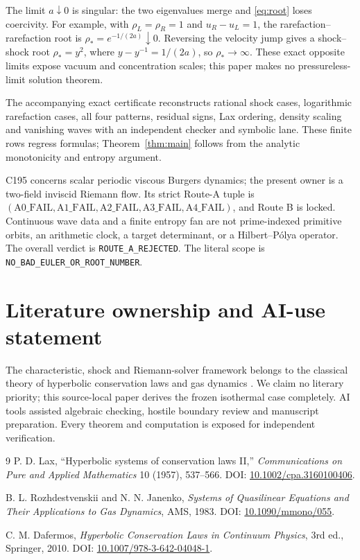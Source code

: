 \documentclass[10pt]{article}
\begin{document}
The limit $a\downarrow0$ is singular: the two eigenvalues merge and
\eqref{eq:root} loses coercivity.  For example, with
$\rho_L=\rho_R=1$ and $u_R-u_L=1$, the rarefaction--rarefaction root is
$\rho_*=e^{-1/(2a)}\downarrow0$.  Reversing the velocity jump gives a
shock--shock root $\rho_*=y^2$, where $y-y^{-1}=1/(2a)$, so
$\rho_*\to\infty$.  These exact opposite limits expose vacuum and
concentration scales; this paper makes no pressureless-limit solution
theorem.

The accompanying exact certificate reconstructs rational shock cases,
logarithmic rarefaction cases, all four patterns, residual signs, Lax ordering,
density scaling and vanishing waves with an independent checker and symbolic
lane.  These finite rows regress formulas; Theorem~\ref{thm:main} follows from
the analytic monotonicity and entropy argument.

C195 concerns scalar periodic viscous Burgers dynamics; the present owner is
a two-field inviscid Riemann flow.  Its strict Route-A tuple is
$(\mathrm{A0\_FAIL},\mathrm{A1\_FAIL},\mathrm{A2\_FAIL},
\mathrm{A3\_FAIL},\mathrm{A4\_FAIL})$, and Route B is locked.  Continuous
wave data and a finite entropy fan are not prime-indexed primitive orbits, an
arithmetic clock, a target determinant, or a Hilbert--P\'olya operator.
The overall verdict is \texttt{ROUTE\_A\_REJECTED}.
The literal scope is \texttt{NO\_BAD\_EULER\_OR\_ROOT\_NUMBER}.
\fi

\section*{Literature ownership and AI-use statement}
The characteristic, shock and Riemann-solver framework belongs to the
classical theory of hyperbolic conservation laws and gas dynamics
\cite{Lax1957,RozhdestvenskiiJanenko1983,Dafermos2010}.  We claim no literary
priority; this source-local paper derives the frozen isothermal case
completely.  AI tools assisted algebraic checking, hostile boundary review
and manuscript preparation.  Every theorem and computation is exposed for
independent verification.

\begin{thebibliography}{9}
P. D. Lax, ``Hyperbolic systems of conservation laws II,''
\emph{Communications on Pure and Applied Mathematics} 10 (1957), 537--566.
DOI: \href{https://doi.org/10.1002/cpa.3160100406}{10.1002/cpa.3160100406}.

B. L. Rozhdestvenskii and N. N. Janenko,
\emph{Systems of Quasilinear Equations and Their Applications to Gas
Dynamics}, AMS, 1983. DOI:
\href{https://doi.org/10.1090/mmono/055}{10.1090/mmono/055}.

C. M. Dafermos, \emph{Hyperbolic Conservation Laws in Continuum Physics},
3rd ed., Springer, 2010. DOI:
\href{https://doi.org/10.1007/978-3-642-04048-1}{10.1007/978-3-642-04048-1}.
\end{thebibliography}
\end{document}
